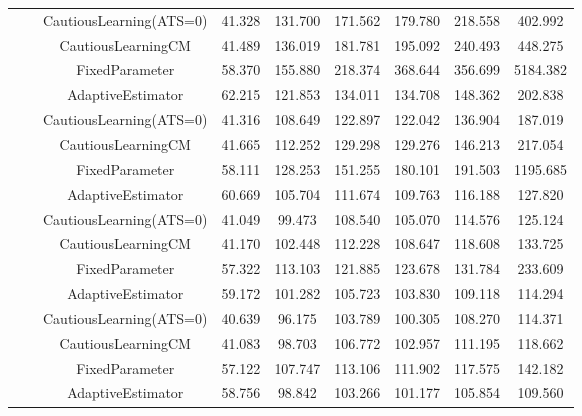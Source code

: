 \begin{table}[!h]
\begin{tabular}[t]{ccccccccc}
 &  & CautiousLearning(ATS=0) & 41.328 & 131.700 & 171.562 & 179.780 & 218.558 & 402.992\\

 &  & CautiousLearningCM & 41.489 & 136.019 & 181.781 & 195.092 & 240.493 & 448.275\\

 & \multirow[t]{-4}{*}{\centering\arraybackslash 0.35} & FixedParameter & 58.370 & 155.880 & 218.374 & 368.644 & 356.699 & 5184.382\\
\cmidrule{2-9}
 &  & AdaptiveEstimator & 62.215 & 121.853 & 134.011 & 134.708 & 148.362 & 202.838\\

 &  & CautiousLearning(ATS=0) & 41.316 & 108.649 & 122.897 & 122.042 & 136.904 & 187.019\\

 &  & CautiousLearningCM & 41.665 & 112.252 & 129.298 & 129.276 & 146.213 & 217.054\\

 & \multirow[t]{-4}{*}{\centering\arraybackslash 0.50} & FixedParameter & 58.111 & 128.253 & 151.255 & 180.101 & 191.503 & 1195.685\\
\cmidrule{2-9}
 &  & AdaptiveEstimator & 60.669 & 105.704 & 111.674 & 109.763 & 116.188 & 127.820\\

 &  & CautiousLearning(ATS=0) & 41.049 & 99.473 & 108.540 & 105.070 & 114.576 & 125.124\\

 &  & CautiousLearningCM & 41.170 & 102.448 & 112.228 & 108.647 & 118.608 & 133.725\\

 & \multirow[t]{-4}{*}{\centering\arraybackslash 0.75} & FixedParameter & 57.322 & 113.103 & 121.885 & 123.678 & 131.784 & 233.609\\
\cmidrule{2-9}
 &  & AdaptiveEstimator & 59.172 & 101.282 & 105.723 & 103.830 & 109.118 & 114.294\\

 &  & CautiousLearning(ATS=0) & 40.639 & 96.175 & 103.789 & 100.305 & 108.270 & 114.371\\

 &  & CautiousLearningCM & 41.083 & 98.703 & 106.772 & 102.957 & 111.195 & 118.662\\

 & \multirow[t]{-4}{*}{\centering\arraybackslash 1.00} & FixedParameter & 57.122 & 107.747 & 113.106 & 111.902 & 117.575 & 142.182\\
\cmidrule{2-9}
 &  & AdaptiveEstimator & 58.756 & 98.842 & 103.266 & 101.177 & 105.854 & 109.560\\


\end{tabular}
\end{table}
